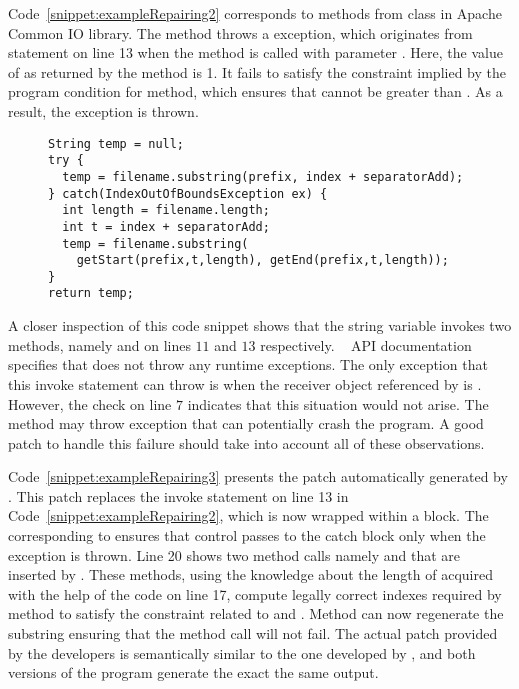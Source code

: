 Code~\ref{snippet:exampleRepairing2} corresponds to methods from
 class in Apache Common IO library. The method
 throws a  exception,
which originates from statement  on line 13 when the method is called with parameter
.  Here, the value of  as returned by the method
 is 1. It fails to satisfy the constraint implied by the
program condition  for 
method, which ensures that  cannot be greater than
. As a result, the exception is thrown.


\begin{figure}[t]
\centering
\begin{lstlisting}
String temp = null;
try {
  temp = filename.substring(prefix, index + separatorAdd);
} catch(IndexOutOfBoundsException ex) {
  int length = filename.length;
  int t = index + separatorAdd;
  temp = filename.substring(
    getStart(prefix,t,length), getEnd(prefix,t,length));
}
return temp;
\end{lstlisting}
\end{figure}

A closer inspection of this code snippet shows that the string variable
 invokes two methods, namely  and 
on lines $11$ and $13$ respectively. \java\  API documentation
specifies that  does not throw any runtime exceptions. The only
exception that this invoke statement can throw is when the receiver object
referenced by  is . However, the check on line $7$
indicates that this situation would not arise. The method  may
throw  exception that can potentially crash the
program. A good patch to handle this failure should take into account all of
these observations. 

Code~\ref{snippet:exampleRepairing3} presents the patch automatically generated
by \tool. This patch replaces the invoke statement on line 13 in
Code~\ref{snippet:exampleRepairing2}, which is now wrapped within a
 block. The  corresponding to
ensures that control passes
to the catch block only when the exception is thrown. Line 20 shows two method
calls namely  and  that are inserted by \tool. These
methods, using the knowledge about the length of  acquired with
the help of the code on line 17, compute legally correct indexes required by
 method to satisfy the constraint related to 
and . Method  can now regenerate the substring
ensuring that the method call will not fail. The actual patch provided by the
developers is semantically similar to the one developed by \tool, and both
versions of the program generate the exact the same output.

